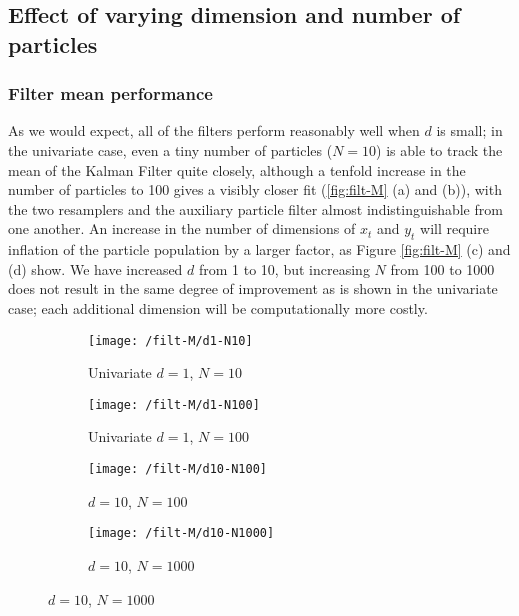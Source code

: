 \documentclass[10pt,fleqn]{article}
\begin{document}
\subsection{Effect of varying dimension and number of particles}

\subsubsection{Filter mean performance}

As we would expect, all of the filters perform reasonably well when $d$ is small; in the univariate case, even a tiny number of particles ($N = 10$) is able to track the mean of the Kalman Filter quite closely, although a tenfold increase in the number of particles to 100 gives a visibly closer fit (\autoref{fig:filt-M} (a) and (b)), with the two resamplers and the auxiliary particle filter almost indistinguishable from one another. An increase in the number of dimensions of $x_t$ and $y_t$ will require inflation of the particle population by a larger factor, as  Figure \ref{fig:filt-M} (c) and (d) show. We have increased $d$ from 1 to 10, but increasing $N$ from 100 to 1000 does not result in the same degree of improvement as is shown in the univariate case; each additional dimension will be computationally more costly.

\begin{figure}[H]		%
\caption{Examples of marginal filter mean performance with varying dimension}
\label{fig:filt-M}

	\begin{subfigure}[t]{0.5\textwidth}
		\caption{Univariate $d = 1$, $N = 10$}
		\texttt{[image: /filt-M/d1-N10]}
	\end{subfigure}
	\begin{subfigure}[t]{0.5\textwidth}
		\caption{Univariate $d = 1$, $N = 100$}
		\label{fig:filt-M:1-100}
		\texttt{[image: /filt-M/d1-N100]}
	\end{subfigure}
	
	\vspace{10pt}
	
	\begin{subfigure}[t]{0.5\textwidth}
		\caption{$d = 10$, $N = 100$}
		\texttt{[image: /filt-M/d10-N100]}
	\end{subfigure}
	\begin{subfigure}[t]{0.5\textwidth}
		\caption{$d = 10$, $N = 1000$}
		\texttt{[image: /filt-M/d10-N1000]}
	\end{subfigure}

\end{figure}
\end{document}
